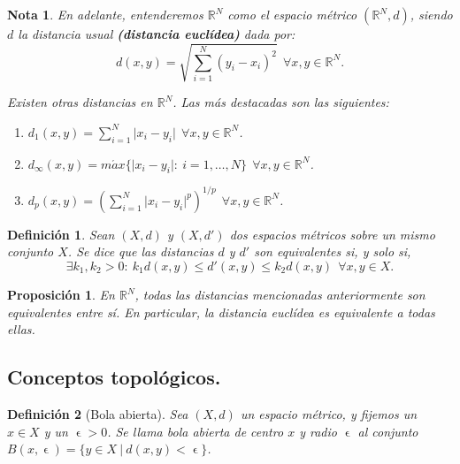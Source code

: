 \documentclass[11pt, a4paper, titlepage]{article}
\let\epsilon\upvarepsilon
\providecommand{\abs}[1]{\lvert#1\rvert}
\theoremstyle{theorem-style}
\newtheorem*{nprop}{Proposición}
\theoremstyle{definition-style}
\newtheorem*{ndef}{Definición}
\theoremstyle{remark-style}
\newtheorem*{nota}{Nota}
\theoremstyle{example-style}
\newenvironment{nlist}
{\begin{enumerate}
\renewcommand\labelenumi{(\emph{\roman{enumi})}}}
{\end{enumerate}}
\begin{document}
\begin{nota}
En adelante, entenderemos $\mathbb{R}^N$ como el espacio métrico $(\mathbb{R}^N,d)$, siendo $d$ la distancia usual \textbf{(distancia euclídea)} dada por: $$d(x,y) = \sqrt{\sum_{i=1}^N (y_i - x_i)^2}\ \ \forall x,y\in \mathbb{R}^N.$$

Existen otras distancias en $\mathbb{R}^N$. Las más destacadas son las siguientes:

\begin{nlist}
\item $\displaystyle d_1(x,y) = \sum_{i=1}^N \abs{x_i - y_i}\ \ \forall x,y \in \mathbb{R}^N$.

\item $\displaystyle d_{\infty}(x,y) = m\acute{a}x \{\abs{x_i - y_i}: \ i=1,\dots,N \}\ \ \forall x,y\in \mathbb{R}^N$.

\item $\displaystyle d_p(x,y) = \left( \sum_{i=1}^N \abs{x_i - y_i}^p \right)^{1/p}\ \ \forall x,y\in \mathbb{R}^N$.\\
\end{nlist}

\end{nota}



\begin{ndef}
Sean $(X,d)$ y $(X,d')$ dos espacios métricos sobre un mismo conjunto $X$. Se dice que las distancias $d$ y $d'$ son \textit{equivalentes} si, y solo si, $$\exists k_1,k_2 > 0 :\ k_1d(x,y)\le d'(x,y) \le k_2d(x,y)\ \ \forall x,y\in X.$$
\end{ndef}



\begin{nprop}
En $\mathbb{R}^N$, todas las distancias mencionadas anteriormente son equivalentes entre sí. En particular, la distancia euclídea es equivalente a todas ellas.
\end{nprop}


\subsection{Conceptos topológicos.} 

\begin{ndef}[Bola abierta]
Sea $(X,d)$ un espacio métrico, y fijemos un $x\in X$ y un $\epsilon > 0$. Se llama \emph{bola abierta de centro $x$ y radio $\epsilon$} al conjunto $B(x,\epsilon) = \{ y\in X \ | \ d(x,y)<\epsilon\}$.
\end{ndef}
\end{document}

